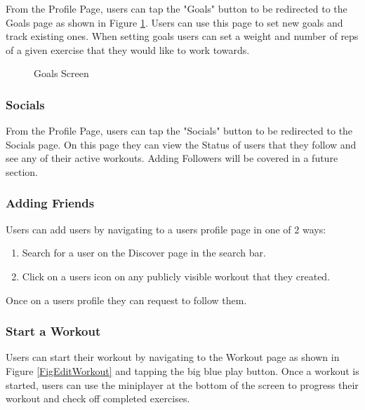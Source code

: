 \documentclass{article}
\begin{document}
From the Profile Page, users can tap the "Goals" button to be redirected to the Goals page as shown in Figure \ref{FigGoals}. Users can use this page to set new goals and track existing ones. When setting goals users can set a weight and number of reps of a given exercise that they would like to work towards.

\begin{figure}[H]
    \centering
    \caption{Goals Screen}
    \label{FigGoals}
    \end{figure}

\subsubsection{Socials}

From the Profile Page, users can tap the "Socials" button to be redirected to the Socials page. On this page they can view the Status of users that they follow and see any of their active workouts. Adding Followers will be covered in a future section.
    
\subsubsection{Adding Friends}

Users can add users by navigating to a users profile page in one of 2 ways:\\
\begin{enumerate}
    \item Search for a user on the Discover page in the search bar.
    \item Click on a users icon on any publicly visible workout that they created.
\end{enumerate}
Once on a users profile they can request to follow them.\\

\subsubsection{Start a Workout}

Users can start their workout by navigating to the Workout page as shown in Figure \ref{FigEditWorkout} and tapping the big blue play button. Once a workout is started, users can use the miniplayer at the bottom of the screen to progress their workout and check off completed exercises.
\end{document}
